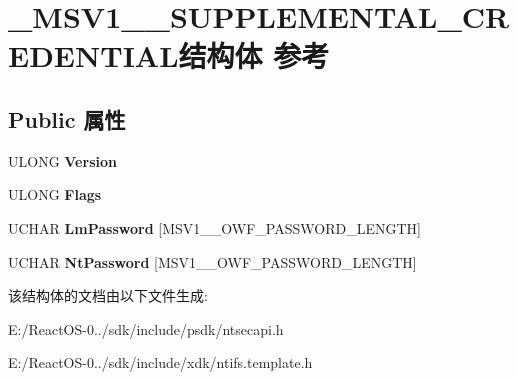 \hypertarget{struct___m_s_v1__0___s_u_p_p_l_e_m_e_n_t_a_l___c_r_e_d_e_n_t_i_a_l}{}\section{\+\_\+\+M\+S\+V1\+\_\+\_\+\+S\+U\+P\+P\+L\+E\+M\+E\+N\+T\+A\+L\+\_\+\+C\+R\+E\+D\+E\+N\+T\+I\+A\+L结构体 参考}
\label{struct___m_s_v1__0___s_u_p_p_l_e_m_e_n_t_a_l___c_r_e_d_e_n_t_i_a_l}
\subsection*{Public 属性}
\begin{DoxyCompactItemize}
\item 
\mbox{\label{struct___m_s_v1__0___s_u_p_p_l_e_m_e_n_t_a_l___c_r_e_d_e_n_t_i_a_l_aeb41c3c3de192d449f58e108012ed2f1}} 
U\+L\+O\+NG {\bfseries Version}
\item 
\mbox{\label{struct___m_s_v1__0___s_u_p_p_l_e_m_e_n_t_a_l___c_r_e_d_e_n_t_i_a_l_a84f10ffa538af14348b0260334b6374a}} 
U\+L\+O\+NG {\bfseries Flags}
\item 
\mbox{\label{struct___m_s_v1__0___s_u_p_p_l_e_m_e_n_t_a_l___c_r_e_d_e_n_t_i_a_l_a2ffd0a0945263caaed7f46a4dc9db56b}} 
U\+C\+H\+AR {\bfseries Lm\+Password} \mbox{[}M\+S\+V1\+\_\+\_\+\+O\+W\+F\+\_\+\+P\+A\+S\+S\+W\+O\+R\+D\+\_\+\+L\+E\+N\+G\+TH\mbox{]}
\item 
\mbox{\label{struct___m_s_v1__0___s_u_p_p_l_e_m_e_n_t_a_l___c_r_e_d_e_n_t_i_a_l_aa1ef18d987fd551dcb2d953c52c6eb5a}} 
U\+C\+H\+AR {\bfseries Nt\+Password} \mbox{[}M\+S\+V1\+\_\+\_\+\+O\+W\+F\+\_\+\+P\+A\+S\+S\+W\+O\+R\+D\+\_\+\+L\+E\+N\+G\+TH\mbox{]}
\end{DoxyCompactItemize}


该结构体的文档由以下文件生成\+:\begin{DoxyCompactItemize}
\item 
E\+:/\+React\+O\+S-\/0../sdk/include/psdk/ntsecapi.\+h\item 
E\+:/\+React\+O\+S-\/0../sdk/include/xdk/ntifs.\+template.\+h\end{DoxyCompactItemize}
